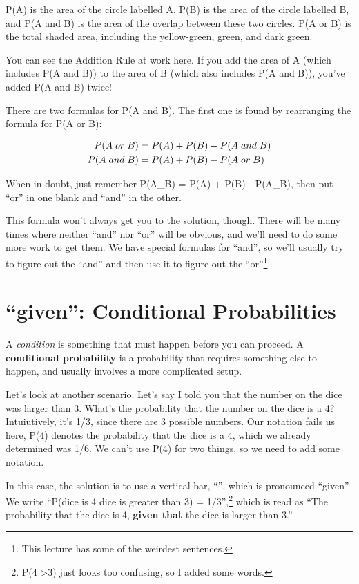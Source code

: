 \documentclass[
  letterpaper,
  DIV=11,
  numbers=noendperiod]{scrreprt}
\begin{document}
P(A) is the area of the circle labelled A, P(B) is the area of the
circle labelled B, and P(A and B) is the area of the overlap between
these two circles. P(A or B) is the total shaded area, including the
yellow-green, green, and dark green.

You can see the Addition Rule at work here. If you add the area of A
(which includes P(A and B)) to the area of B (which also includes P(A
and B)), you've added P(A and B) twice!

There are two formulas for P(A and B). The first one is found by
rearranging the formula for P(A or B):

\begin{align*}
\small P(A\; or\; B) &\small = P(A) + P(B) - P(A \;and\; B)\\
\small P(A\; and\; B) &\small = P(A) + P(B) - P(A \;or\; B)
\end{align*}

When in doubt, just remember P(A\_B) = P(A) + P(B) - P(A\_B), then put
``or'' in one blank and ``and'' in the other.

This formula won't always get you to the solution, though. There will be
many times where neither ``and'' nor ``or'' will be obvious, and we'll
need to do some more work to get them. We have special formulas for
``and'', so we'll usually try to figure out the ``and'' and then use it
to figure out the ``or''\footnote{This lecture has some of the weirdest
  sentences.}.

\hypertarget{given-conditional-probabilities}{%
\section{``given'': Conditional
Probabilities}\label{given-conditional-probabilities}}

A \emph{condition} is something that must happen before you can proceed.
A \textbf{conditional probability} is a probability that requires
something else to happen, and usually involves a more complicated setup.

Let's look at another scenario. Let's say I told you that the number on
the dice was larger than 3. What's the probability that the number on
the dice is a 4? Intuiutively, it's 1/3, since there are 3 possible
numbers. Our notation fails us here, P(4) denotes the probability that
the dice is a 4, which we already determined was 1/6. We can't use P(4)
for two things, so we need to add some notation.

In this case, the solution is to use a vertical bar, ``\textbar{}'',
which is pronounced ``given''. We write ``P(dice is 4 \textbar{} dice is
greater than 3) = 1/3'',\footnote{P(4 \textbar{} \textgreater3) just
  looks too confusing, so I added some words.} which is read as ``The
probability that the dice is 4, \textbf{given that} the dice is larger
than 3.''
\end{document}
